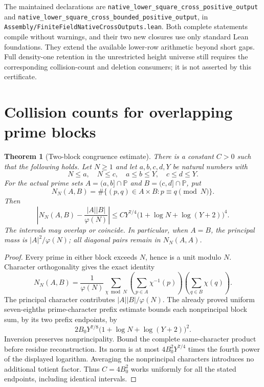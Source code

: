 \documentclass[11pt]{article}
\newtheorem{theorem}{Theorem}[section]
\begin{document}
The maintained declarations are
\texttt{native\_lower\_square\_cross\_positive\_output} and
\texttt{native\_lower\_square\_cross\_bounded\_positive\_output},
in \texttt{Assembly/\allowbreak FiniteFieldNativeCrossOutputs.\allowbreak lean}.
Both complete statements compile without warnings, and their
two new closures use only standard Lean foundations.
They extend the available lower-row arithmetic beyond short gaps.
Full density-one retention in the unrestricted height universe
still requires the corresponding collision-count and deletion
consumers; it is not asserted by this certificate.

\section{Collision counts for overlapping prime blocks}
\label{sec:native-arbitrary-block-collision}

\begin{theorem}[Two-block congruence estimate]
\label{thm:native-arbitrary-block-collision}
There is a constant \(C>0\) such that the following holds.
Let \(N\ge1\) and let \(a,b,c,d,Y\) be natural numbers with
\[
 N\le a,\quad N\le c,\quad a\le b\le Y,\quad c\le d\le Y.
\]
For the actual prime sets \(A=(a,b]\cap\mathbb P\) and
\(B=(c,d]\cap\mathbb P\), put
\[
 N_N(A,B)=\#\{(p,q)\in A\times B:p\equiv q\pmod N\}.
\]
Then
\[
 \left|N_N(A,B)-\frac{|A||B|}{\varphi(N)}\right|
 \le C Y^{7/4}\bigl(1+\log N+\log(Y+2)\bigr)^4.
\]
The intervals may overlap or coincide. In particular, when
\(A=B\), the principal mass is \(|A|^2/\varphi(N)\);
all diagonal pairs remain in \(N_N(A,A)\).
\end{theorem}

\begin{proof}
Every prime in either block exceeds \(N\), hence is a unit
modulo \(N\). Character orthogonality gives the exact identity
\[
 N_N(A,B)=\frac1{\varphi(N)}
 \sum_{\chi\bmod N}
 \left(\sum_{p\in A}\chi^{-1}(p)\right)
 \left(\sum_{q\in B}\chi(q)\right).
\]
The principal character contributes \(|A||B|/\varphi(N)\).
The already proved uniform seven-eighths prime-character
prefix estimate bounds each nonprincipal block sum, by its
two prefix endpoints, by
\[
 2B_0Y^{7/8}
 \bigl(1+\log N+\log(Y+2)\bigr)^2.
\]
Inversion preserves nonprincipality. Bound the complete
same-character product before residue reconstruction.
Its norm is at most \(4B_0^2Y^{7/4}\) times the fourth power
of the displayed logarithm. Averaging the nonprincipal
characters introduces no additional totient factor.
Thus \(C=4B_0^2\) works uniformly for all the stated endpoints,
including identical intervals.
\end{proof}
\end{document}

